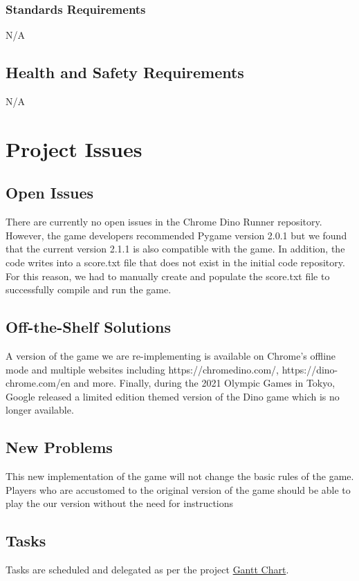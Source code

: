\documentclass[12pt]{article}
\begin{document}
    \subsubsection{Standards Requirements} 
    N/A
    
\subsection{Health and Safety Requirements}
    N/A
    
    
\section{Project Issues}
\subsection{Open Issues}
There are currently no open issues in the Chrome Dino Runner repository.
However, the game developers recommended Pygame version 2.0.1 but we found that the current version 2.1.1 is also compatible with the game.
In addition, the code writes into a score.txt file that does not exist in the initial code repository. For this reason, we had to manually create and populate the score.txt file to successfully compile and run the game.
\subsection{Off-the-Shelf Solutions}
A version of the game we are re-implementing is available on Chrome's offline mode and multiple websites including
https://chromedino.com/, https://dino-chrome.com/en and more.
Finally, during the 2021 Olympic Games in Tokyo, Google released
a limited edition themed version of the Dino game which is no longer available. 
\subsection{New Problems}
This new implementation of the game will not change the basic rules of the game.
Players who are accustomed to the original version of the game should be able to play the our version without
the need for instructions
\subsection{Tasks}

Tasks are scheduled and delegated as per the project
\label{subsec:Tasks}
\href{https://gitlab.cas.mcmaster.ca/maramotc/se3xa3/-/blob/main/GanttChart.pdf}{\color{blue}Gantt Chart}.
\end{document}
